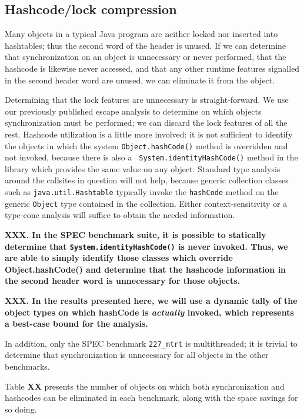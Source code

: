 \documentclass[preprint]{acmconf}
\begin{document}
\subsection{Hashcode/lock compression}
Many objects in a typical Java program are neither locked nor inserted
into hashtables; thus the second word of the header is unused.
If we can determine that synchronization on an object is unnecessary
or never performed, that the hashcode is likewise never accessed,
and that any other runtime features signalled in the second header
word are unused, we can eliminate it from the object.

Determining that the lock features are unnecessary is straight-forward.
We use our previously published escape analysis \cite{whaley99,vivien01}
to determine on which objects synchronization must be performed; we
can discard the lock features of all the rest.  Hashcode utilization
is a little more involved: it is not sufficient to identify the
objects in which the system {\tt Object.hashCode()} method is
overridden and not invoked, because there is also a {\tt
  System.identityHashCode()} method in the library which provides the
same value on any object.  Standard type analysis around the
callsites in question will not help, because generic collection
classes such as {\tt java.util.Hashtable} typically invoke
the {\tt hashCode} method on the generic {\tt Object} type contained
in the collection.  Either context-sensitivity or a type-cone analysis
will suffice to obtain the needed information.

{\bf XXX.  In the SPEC benchmark suite, it is possible to statically
  determine that {\tt System.identityHashCode()} is never invoked.
  Thus, we are able to simply identify those classes which override
  Object.hashCode() and determine that the hashcode information in the
  second header word is unnecessary for those objects.}

{\bf XXX. In the results presented here, we will use a dynamic tally
of the object types on which hashCode is {\it actually} invoked, which
represents a best-case bound for the analysis.}

In addition, only the SPEC benchmark {\tt 227\_mtrt} is multithreaded;
it is trivial to determine that synchronization is unnecessary for all
objects in the other benchmarks.

Table {\bf XX} presents the number of objects on which both
synchronization and hashcodes can be eliminated in each benchmark,
along with the space savings for so doing.
\end{document}
